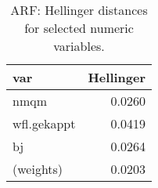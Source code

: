 \begin{table}[ht]
\centering
\begin{tabular}{lr}
  \hline
var & Hellinger \\ 
  \hline
nmqm & 0.0260 \\ 
  wfl.gekappt & 0.0419 \\ 
  bj & 0.0264 \\ 
  (weights) & 0.0203 \\ 
   \hline
\end{tabular}
\caption{ARF: Hellinger distances for selected numeric variables.} 
\label{tab:arf:hellinger}
\end{table}
